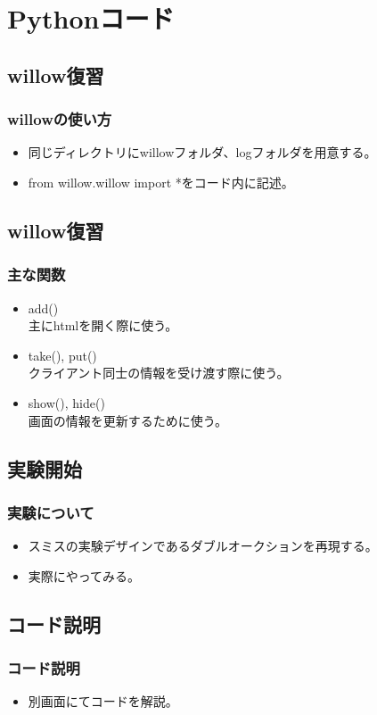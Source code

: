 \documentclass[dvipdfmx,12pt]{beamer}
\begin{document}
\section{Pythonコード}
\subsection{willow復習}
\begin{frame}
\frametitle{willowの使い方}
\begin{itemize}\setlength{\parskip}{0.5em}
\item
同じディレクトリにwillowフォルダ、logフォルダを用意する。
\item
from willow.willow import *をコード内に記述。
\end{itemize}
\end{frame}

\subsection{willow復習}
\begin{frame}
\frametitle{主な関数}
\begin{itemize}\setlength{\parskip}{0.5em}
\item
add()\\
主にhtmlを開く際に使う。
\item
take(), put()\\
クライアント同士の情報を受け渡す際に使う。
\item
show(), hide()\\
画面の情報を更新するために使う。
\end{itemize}
\end{frame}

\subsection{実験開始}
\begin{frame}
\frametitle{実験について}
\begin{itemize}\setlength{\parskip}{0.5em}
\item
スミスの実験デザインであるダブルオークションを再現する。
\item
実際にやってみる。
\end{itemize}
\end{frame}

\subsection{コード説明}
\begin{frame}
\frametitle{コード説明}
\begin{itemize}\setlength{\parskip}{0.5em}
\item
別画面にてコードを解説。
\end{itemize}
\end{frame}
\end{document}
